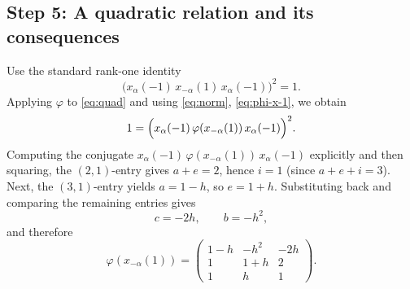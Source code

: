 \documentclass[]{jgcc}
\numberwithin{equation}{section}
\begin{document}
\subsection*{Step 5: A quadratic relation and its consequences}
Use the standard rank-one identity
\begin{equation}\label{eq:quad}
\bigl(x_\alpha (-1)\,x_{-\alpha}(1)\, x_\alpha (-1)\bigr)^2=1.
\end{equation}
Applying $\varphi$ to \eqref{eq:quad} and using \eqref{eq:norm}, \eqref{eq:phi-x-1}, we obtain
\[
1=\Bigl(x_\alpha(-1)\,\varphi(x_{-\alpha}(1))\,x_\alpha(-1)\Bigr)^2.
\]
Computing the conjugate $x_\alpha(-1)\,\varphi(x_{-\alpha}(1))\,x_\alpha(-1)$ explicitly and then squaring,
the $(2,1)$-entry gives $a+e=2$, hence $i=1$ (since $a+e+i=3$).
Next, the $(3,1)$-entry yields $a=1-h$, so $e=1+h$.
Substituting back and comparing the remaining entries gives
\[
c=-2h,\qquad b=-h^2,
\]
and therefore
\begin{equation}\label{eq:phi-x-1-final}
\varphi (x_{-\alpha}(1))=
\begin{pmatrix}
1-h& -h^2& -2h\\
1& 1+h& 2\\
1& h& 1
\end{pmatrix}.
\end{equation}
\end{document}
